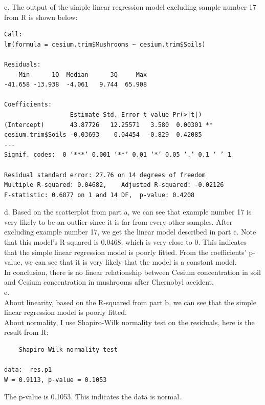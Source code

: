 \documentclass[12pt]{article}
\begin{document}
c. The output of the simple linear regression model excluding sample
number 17 from R is shown below:

\begin{verbatim}
Call:
lm(formula = cesium.trim$Mushrooms ~ cesium.trim$Soils)

Residuals:
    Min      1Q  Median      3Q     Max 
-41.658 -13.938  -4.061   9.744  65.908 

Coefficients:
                  Estimate Std. Error t value Pr(>|t|)   
(Intercept)       43.87726   12.25571   3.580  0.00301 **
cesium.trim$Soils -0.03693    0.04454  -0.829  0.42085   
---
Signif. codes:  0 ‘***’ 0.001 ‘**’ 0.01 ‘*’ 0.05 ‘.’ 0.1 ‘ ’ 1 

Residual standard error: 27.76 on 14 degrees of freedom
Multiple R-squared: 0.04682,	Adjusted R-squared: -0.02126 
F-statistic: 0.6877 on 1 and 14 DF,  p-value: 0.4208 
\end{verbatim}

d. Based on the scatterplot from part a, we can see that example
number 17 is very likely to be an outlier since it is far from every
other samples. After excluding example number 17, we get the linear
model described in part c. Note that this model's R-squared is 0.0468,
which is very close to 0. This indicates that the simple linear
regression model is poorly fitted. From the coefficients' p-value, we
can see that it is very likely that the model is a constant model.\\

In conclusion, there is no linear relationship between Cesium
concentration in soil and Cesium concentration in mushrooms after
Chernobyl accident.\\

e.\\ 

About linearity, based on the R-squared from part b, we can see that
the simple linear regression model is poorly fitted. \\

About normality, I use Shapiro-Wilk normality test on the residuals,
here is the result from R: 

\begin{verbatim}
	Shapiro-Wilk normality test

data:  res.p1 
W = 0.9113, p-value = 0.1053
\end{verbatim}

The p-value is 0.1053. This indicates the data is normal.\\
\end{document}
